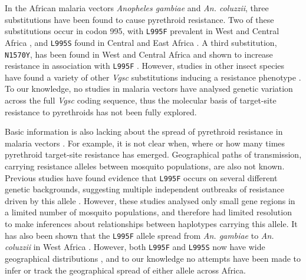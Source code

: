 \documentclass[a4paper,11pt,abstracton,hidelinks]{scrartcl}
\begin{document}
In the African malaria vectors \textit{Anopheles gambiae} and \textit{An. coluzzii}, three substitutions have been found to cause pyrethroid resistance.
%
Two of these substitutions occur in codon 995\footnotemark, with \texttt{L995F} prevalent in West and Central Africa \cite{Martinez-Torres1998,Silva2014}, and \texttt{L995S} found in Central and East Africa \cite{Ranson2000,Silva2014}.
%
A third substitution, \texttt{N1570Y}, has been found in West and Central Africa and shown to increase resistance in association with \texttt{L995F} \cite{Jones2012}.
%
However, studies in other insect species have found a variety of other \emph{Vgsc} substitutions inducing a resistance phenotype \cite{Davies2007b,Rinkevich2013,Dong2014}.
%
To our knowledge, no studies in malaria vectors have analysed genetic variation across the full \emph{Vgsc} coding sequence, thus the molecular basis of target-site resistance to pyrethroids has not been fully explored.


Basic information is also lacking about the spread of pyrethroid resistance in malaria vectors \cite{WorldHealthOrganization2012}.
%
For example, it is not clear when, where or how many times pyrethroid target-site resistance has emerged.
%
Geographical paths of transmission, carrying resistance alleles between mosquito populations, are also not known.
%
Previous studies have found evidence that \texttt{L995F} occurs on several different genetic backgrounds, suggesting multiple independent outbreaks of resistance driven by this allele \cite{Pinto2007,Etang2009,Lynd2010,Santolamazza2015}.
%
However, these studies analysed only small gene regions in a limited number of mosquito populations, and therefore had limited resolution to make inferences about relationships between haplotypes carrying this allele.
%
It has also been shown that the \texttt{L995F} allele spread from \textit{An. gambiae} to \textit{An. coluzzii} in West Africa \cite{weill2000,diabate2004,Clarkson2014,Norris2015}.
%
However, both \texttt{L995F} and \texttt{L995S} now have wide geographical distributions \cite{Silva2014}, and to our knowledge no attempts have been made to infer or track the geographical spread of either allele across Africa.
\end{document}
